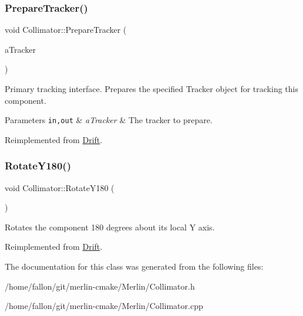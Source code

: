 \subsubsection{\texorpdfstring{Prepare\+Tracker()}{PrepareTracker()}}
{\footnotesize\ttfamily void Collimator\+::\+Prepare\+Tracker (\begin{DoxyParamCaption}\item[{\hyperlink{classComponentTracker}{Component\+Tracker} \&}]{a\+Tracker }\end{DoxyParamCaption})\hspace{0.3cm}{\ttfamily [virtual]}}

Primary tracking interface. Prepares the specified Tracker object for tracking this component. 
\begin{DoxyParams}[1]{Parameters}
\mbox{\tt in,out}  & {\em a\+Tracker} & The tracker to prepare. \\
\hline
\end{DoxyParams}


Reimplemented from \hyperlink{classDrift_a9f3925549a0c7c99b39a1abea8546642}{Drift}.

\mbox{\label{classCollimator_a89d782779f8e57af28eeb963078bbf20}} 
\subsubsection{\texorpdfstring{Rotate\+Y180()}{RotateY180()}}
{\footnotesize\ttfamily void Collimator\+::\+Rotate\+Y180 (\begin{DoxyParamCaption}{ }\end{DoxyParamCaption})\hspace{0.3cm}{\ttfamily [virtual]}}

Rotates the component 180 degrees about its local Y axis. 

Reimplemented from \hyperlink{classDrift_abf387eddfcabfc81b186080f6301ce60}{Drift}.



The documentation for this class was generated from the following files\+:\begin{DoxyCompactItemize}
\item 
/home/fallon/git/merlin-\/cmake/\+Merlin/Collimator.\+h\item 
/home/fallon/git/merlin-\/cmake/\+Merlin/Collimator.\+cpp\end{DoxyCompactItemize}
